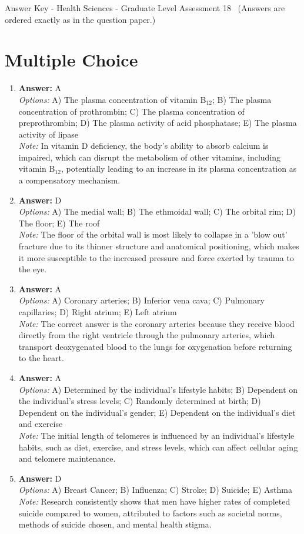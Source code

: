 \documentclass[12pt]{article}
\begin{document}
\begin{center}
Answer Key - Health Sciences - Graduate Level Assessment 18 \
\small (Answers are ordered exactly as in the question paper.)
\end{center}

\section*{Multiple Choice}
\begin{enumerate}[label=\arabic*.]
\item \textbf{Answer:} A
\\ \textit{Options:} A) The plasma concentration of vitamin B$_{12}$; B) The plasma concentration of prothrombin; C) The plasma concentration of preprothrombin; D) The plasma activity of acid phosphatase; E) The plasma activity of lipase
\\ \textit{Note:} In vitamin D deficiency, the body's ability to absorb calcium is impaired, which can disrupt the metabolism of other vitamins, including vitamin B$_{12}$, potentially leading to an increase in its plasma concentration as a compensatory mechanism.
\item \textbf{Answer:} D
\\ \textit{Options:} A) The medial wall; B) The ethmoidal wall; C) The orbital rim; D) The floor; E) The roof
\\ \textit{Note:} The floor of the orbital wall is most likely to collapse in a 'blow out' fracture due to its thinner structure and anatomical positioning, which makes it more susceptible to the increased pressure and force exerted by trauma to the eye.
\item \textbf{Answer:} A
\\ \textit{Options:} A) Coronary arteries; B) Inferior vena cava; C) Pulmonary capillaries; D) Right atrium; E) Left atrium
\\ \textit{Note:} The correct answer is the coronary arteries because they receive blood directly from the right ventricle through the pulmonary arteries, which transport deoxygenated blood to the lungs for oxygenation before returning to the heart.
\item \textbf{Answer:} A
\\ \textit{Options:} A) Determined by the individual's lifestyle habits; B) Dependent on the individual's stress levels; C) Randomly determined at birth; D) Dependent on the individual's gender; E) Dependent on the individual's diet and exercise
\\ \textit{Note:} The initial length of telomeres is influenced by an individual's lifestyle habits, such as diet, exercise, and stress levels, which can affect cellular aging and telomere maintenance.
\item \textbf{Answer:} D
\\ \textit{Options:} A) Breast Cancer; B) Influenza; C) Stroke; D) Suicide; E) Asthma
\\ \textit{Note:} Research consistently shows that men have higher rates of completed suicide compared to women, attributed to factors such as societal norms, methods of suicide chosen, and mental health stigma.
\end{enumerate}
\end{document}
